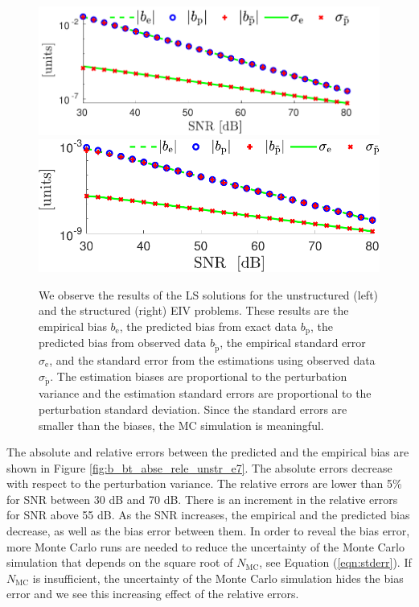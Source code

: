 \begin{figure}[htb!]
    \centering
        \includegraphics[width=1\textwidth]{./ChapterStatisticalAnalysis/fig/Fig_1l.pdf} 
        \includegraphics[width=1\textwidth]{./ChapterStatisticalAnalysis/fig/Fig_1r.pdf} 
  \caption{ \label{bias_sigma_NMC_unstr_str_n2} We observe the results of the LS solutions for the unstructured (left) and the structured (right) EIV problems. These results are the empirical bias $b_{\mathrm{e}}$, the predicted bias from exact data $b_{\mathrm{p}}$, the predicted bias from observed data $b_{\widetilde{\mathrm{p}}}$, the empirical standard error $\sigma_{\mathrm{e}}$, and the standard error from the estimations using observed data $\sigma_{\widetilde{\mathrm{p}}}$. The estimation biases are proportional to the perturbation variance and the estimation standard errors are proportional to the perturbation standard deviation. Since the standard errors are smaller than the biases, the MC simulation is meaningful. }
\end{figure}

The absolute and relative errors between the predicted and the empirical bias are shown in Figure \ref{fig:b_bt_abse_rele_unstr_e7}. 
The absolute errors decrease with respect to the perturbation variance.
The relative errors are lower than 5\% for SNR between 30 dB and 70 dB. 
There is an increment in the relative errors for SNR above 55 dB. 
 As the SNR increases, the empirical and the predicted bias decrease, as well as the bias error between them.
In order to reveal the bias error, more Monte Carlo runs are needed to reduce the uncertainty of the Monte Carlo simulation that depends on the square root of $N_{\mathrm{MC}}$, see Equation (\ref{eqn:stderr}).
If $N_{\mathrm{MC}}$ is insufficient, the uncertainty of the Monte Carlo simulation hides the bias error and we see this increasing effect of the relative errors. 

